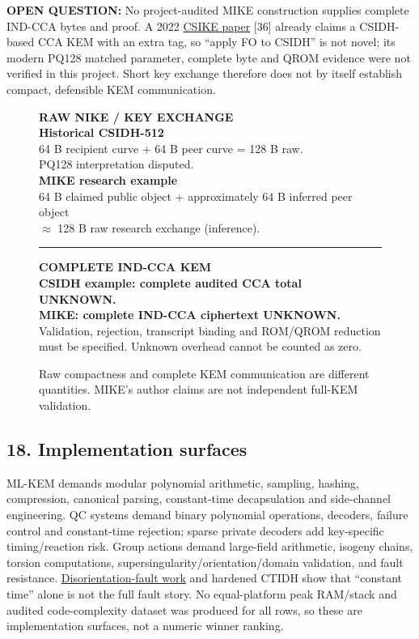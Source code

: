 \documentclass[
  10pt,
  a4paper,
]{article}
\begin{document}
\textbf{OPEN QUESTION:} No project-audited MIKE construction supplies
complete IND-CCA bytes and proof. A 2022
\href{https://doi.org/10.1515/jmc-2022-0007}{CSIKE paper} {[}36{]}
already claims a CSIDH-based CCA KEM with an extra tag, so ``apply FO to
CSIDH'' is not novel; its modern PQ128 matched parameter, complete byte
and QROM evidence were not verified in this project. Short key exchange
therefore does not by itself establish compact, defensible KEM
communication.

\begin{figure}[htbp]
\centering
\begin{minipage}{.93\linewidth}
\textsf{\textbf{RAW NIKE / KEY EXCHANGE}}\\[12pt]
\textbf{Historical CSIDH-512}\\
64 B recipient curve + 64 B peer curve = 128 B raw.\\
PQ128 interpretation disputed.\\[14pt]
\textbf{MIKE research example}\\
64 B claimed public object + approximately 64 B inferred peer object\\
$\approx$ 128 B raw research exchange (inference).\\[22pt]
\hrule\vspace{16pt}
\textsf{\textbf{COMPLETE IND-CCA KEM}}\\[12pt]
\textbf{CSIDH example: complete audited CCA total UNKNOWN.}\\[8pt]
\textbf{MIKE: complete IND-CCA ciphertext UNKNOWN.}\\[12pt]
Validation, rejection, transcript binding and ROM/QROM reduction must be specified. Unknown overhead cannot be counted as zero.
\end{minipage}
\caption{Raw compactness and complete KEM communication are different quantities. MIKE's author claims are not independent full-KEM validation.}\label{fig:group}
\end{figure}

\hypertarget{implementation-surfaces}{%
\subsection{18. Implementation surfaces}\label{implementation-surfaces}}

ML-KEM demands modular polynomial arithmetic, sampling, hashing,
compression, canonical parsing, constant-time decapsulation and
side-channel engineering. QC systems demand binary polynomial
operations, decoders, failure control and constant-time rejection;
sparse private decoders add key-specific timing/reaction risk. Group
actions demand large-field arithmetic, isogeny chains, torsion
computations, supersingularity/orientation/domain validation, and fault
resistance. \href{https://ir.cwi.nl/pub/33834}{Disorientation-fault
work} and hardened CTIDH show that ``constant time'' alone is not the
full fault story. No equal-platform peak RAM/stack and audited
code-complexity dataset was produced for all rows, so these are
implementation surfaces, not a numeric winner ranking.
\end{document}
